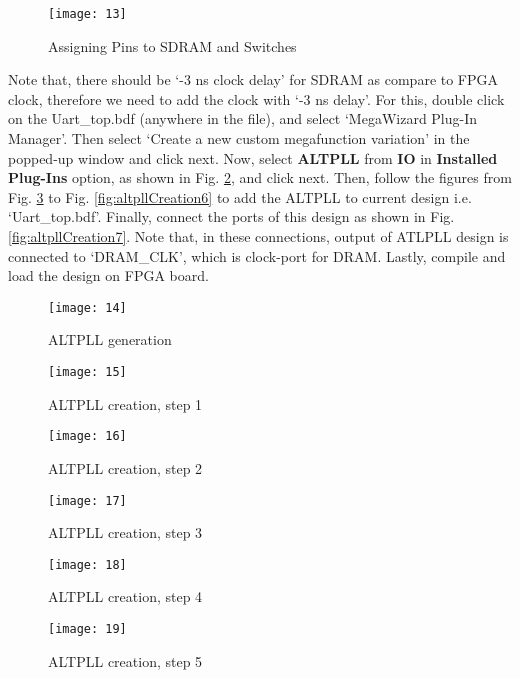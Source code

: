\begin{figure}[!h]
	\centering
	\texttt{[image: 13]}
	\caption{Assigning Pins to SDRAM and Switches}
	\label{fig:SDRAM_Pinassg}
\end{figure}

Note that, there should be `-3 ns clock delay' for SDRAM as compare to FPGA clock, therefore we need to add the clock with `-3 ns delay'. For this, double click on the Uart\_top.bdf (anywhere in the file), and select `MegaWizard Plug-In Manager'. Then select `Create a new custom megafunction variation' in the popped-up window and click next. Now, select \textbf{ALTPLL} from \textbf{IO} in \textbf{Installed Plug-Ins} option, as shown in Fig. \ref{fig:dram_clock_altpll}, and click next. Then, follow the figures from Fig. \ref{fig:altpllCreation1} to Fig. \ref{fig:altpllCreation6} to add the ALTPLL to current design i.e. `Uart\_top.bdf'. Finally, connect the ports of this design as shown in Fig. \ref{fig:altpllCreation7}. Note that, in these connections, output of ATLPLL design is connected to `DRAM\_CLK', which is clock-port for DRAM. Lastly, compile and load the design on FPGA board. 

\begin{figure}[!h]
	\centering
	\texttt{[image: 14]}
	\caption{ALTPLL generation}
	\label{fig:dram_clock_altpll}
\end{figure}

\begin{figure}[!h]
	\centering
	\texttt{[image: 15]}
	\caption{ALTPLL creation, step 1}
	\label{fig:altpllCreation1}
\end{figure}

\begin{figure}[!h]
	\centering
	\texttt{[image: 16]}
	\caption{ALTPLL creation, step 2}
	\label{fig:altpllCreation2}
\end{figure}

\begin{figure}[!h]
	\centering
	\texttt{[image: 17]}
	\caption{ALTPLL creation, step 3}
	\label{fig:altpllCreation3}
\end{figure}

\begin{figure}[!h]
	\centering
	\texttt{[image: 18]}
	\caption{ALTPLL creation, step 4}
	\label{fig:altpllCreation4}
\end{figure}

\begin{figure}[!h]
	\centering
	\texttt{[image: 19]}
	\caption{ALTPLL creation, step 5}
	\label{fig:altpllCreation5}
\end{figure}

